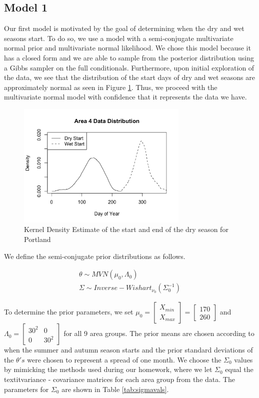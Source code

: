 \documentclass{article}
\begin{document}
\subsection{Model 1}
Our first model is motivated by the goal of determining when the dry and wet seasons start. To do so, we use a model with a semi-conjugate multivariate normal prior and multivariate normal likelihood. We chose this model because it has a closed form and we are able to sample from the posterior distribution using a Gibbs sampler on the full conditionals. Furthermore, upon initial exploration of the data, we see that the distribution of the start days of dry and wet seasons are approximately normal as seen in Figure \ref{PDXexample}. Thus, we proceed with the multivariate normal model with confidence that it represents the data we have. 

\begin{figure}[H]
\includegraphics[width = .4\textwidth, height = 6cm]{Area4DataDistribution}
\caption{Kernel Density Estimate of the start and end of the dry season for Portland}
\label{PDXexample}
\end{figure}

We define the semi-conjugate prior distributions as follows. 

\begin{align*}
\theta \sim MVN(\mu_0, \Lambda_0) \\
\Sigma \sim Inverse-Wishart_{\nu_0}(\Sigma_0^{-1})
\end{align*}

To determine the prior parameters, we set $\mu_0 = \begin{bmatrix} X_{min} \\ X_{max} \end{bmatrix} = \begin{bmatrix} 170 \\ 260 \end{bmatrix}$ and $\Lambda_0 = \begin{bmatrix} 30^2 & 0 \\ 0 & 30^2 \end{bmatrix}$ for all 9 area groups. The prior means are chosen according to when the summer and autumn season starts and the prior standard deviations of the $\theta 's$ were chosen to represent a spread of one month. We choose the $\Sigma_0$ values by mimicking the methods used during our homework, where we let $\Sigma_0$ equal the textit{variance - covariance} matrices for each area group from the data. The parameters for $\Sigma_0$ are shown in Table \ref{tab:sigmavals}.
\end{document}
